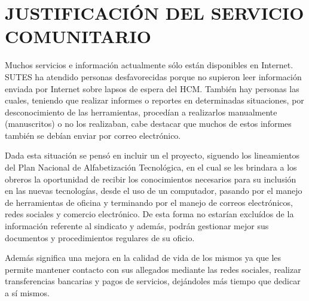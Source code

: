 \section{JUSTIFICACIÓN DEL SERVICIO COMUNITARIO}
		Muchos servicios e información actualmente sólo están disponibles en Internet. SUTES ha atendido personas desfavorecidas porque no supieron leer información enviada por Internet sobre lapsos de espera del HCM. También hay personas las cuales, teniendo que realizar informes o reportes en determinadas situaciones, por desconocimiento de las herramientas, procedían a realizarlos manualmente (manuscritos) o no los realizaban, cabe destacar que muchos de estos informes también se debían enviar por correo electrónico.
        
        Dada esta situación se pensó en incluir un el proyecto, siguendo los lineamientos del Plan Nacional de Alfabetización Tecnológica, en el cual se les brindara a los obreros la oportunidad de recibir los conocimientos necesarios para su inclusión en las nuevas tecnologías, desde el uso de un computador, pasando por el manejo de herramientas de oficina y terminando por el manejo de correos electrónicos, redes sociales y comercio electrónico. De esta forma no estarían excluídos de la información referente al sindicato y además, podrán gestionar mejor sus documentos y procedimientos regulares de su oficio.
        
        Además significa una mejora en la calidad de vida de los mismos ya que les permite mantener contacto con sus allegados mediante las redes sociales, realizar transferencias bancarias y pagos de servicios, dejándoles más tiempo que dedicar a sí mismos.
	\pagebreak